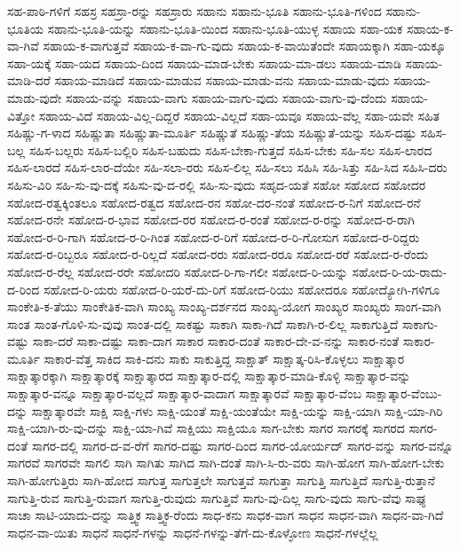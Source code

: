 {ಸಹ-ಪಾಠಿ-ಗಳಿಗೆ
ಸಹಸ್ರ
ಸಹಸ್ರಾ-ರನ್ನು
ಸಹಸ್ರಾರು
ಸಹಾನು
ಸಹಾನು-ಭೂತಿ
ಸಹಾನು-ಭೂತಿ-ಗಳಿಂದ
ಸಹಾನು-ಭೂತಿಯ
ಸಹಾನು-ಭೂತಿ-ಯನ್ನು
ಸಹಾನು-ಭೂತಿ-ಯಿಂದ
ಸಹಾನು-ಭೂತಿ-ಯುಳ್ಳ
ಸಹಾಯ
ಸಹಾ-ಯಕ
ಸಹಾಯ-ಕ-ವಾ-ಗಿವೆ
ಸಹಾಯ-ಕ-ವಾಗುತ್ತವೆ
ಸಹಾಯ-ಕ-ವಾ-ಗು-ವುದು
ಸಹಾಯ-ಕ-ವಾಯಿತೆಂದೇ
ಸಹಾಯಕ್ಕಾಗಿ
ಸಹಾ-ಯಕ್ಕೂ
ಸಹಾ-ಯಕ್ಕೆ
ಸಹಾ-ಯದ
ಸಹಾಯ-ದಿಂದ
ಸಹಾಯ-ಮಾಡ-ಬೇಕು
ಸಹಾಯ-ಮಾ-ಡಲು
ಸಹಾಯ-ಮಾಡಿ
ಸಹಾಯ-ಮಾಡಿ-ದರೆ
ಸಹಾಯ-ಮಾಡಿದೆ
ಸಹಾಯ-ಮಾಡುವ
ಸಹಾಯ-ಮಾಡು-ವನು
ಸಹಾಯ-ಮಾಡು-ವುದು
ಸಹಾಯ-ಮಾಡು-ವುದೇ
ಸಹಾಯ-ವನ್ನು
ಸಹಾಯ-ವಾಗು
ಸಹಾಯ-ವಾಗು-ವುದು
ಸಹಾಯ-ವಾಗು-ವು-ದೆಂದು
ಸಹಾಯ-ವಿತ್ತೋ
ಸಹಾಯ-ವಿದೆ
ಸಹಾಯ-ವಿಲ್ಲ-ದಿದ್ದರೆ
ಸಹಾಯ-ವಿಲ್ಲದೆ
ಸಹಾ-ಯವೂ
ಸಹಾಯ-ವೆಲ್ಲ
ಸಹಾ-ಯವೇ
ಸಹಿತ
ಸಹಿಷ್ಣು-ಗ-ಳಾದ
ಸಹಿಷ್ಣುತಾ
ಸಹಿಷ್ಣುತಾ-ಮೂರ್ತಿ
ಸಹಿಷ್ಣುತೆ
ಸಹಿಷ್ಣು-ತೆಯ
ಸಹಿಷ್ಣುತೆ-ಯನ್ನು
ಸಹಿಸ-ದಷ್ಟು
ಸಹಿಸ-ಬಲ್ಲ
ಸಹಿಸ-ಬಲ್ಲರು
ಸಹಿಸ-ಬಲ್ಲಿರಿ
ಸಹಿಸ-ಬಹುದು
ಸಹಿಸ-ಬೇಕಾ-ಗುತ್ತದೆ
ಸಹಿಸ-ಬೇಕು
ಸಹಿ-ಸಲ
ಸಹಿಸ-ಲಾರದ
ಸಹಿಸ-ಲಾರದೆ
ಸಹಿಸ-ಲಾರ-ದೆಯೇ
ಸಹಿ-ಸಲಾ-ರರು
ಸಹಿಸ-ಲಿಲ್ಲ
ಸಹಿ-ಸಲು
ಸಹಿಸಿ
ಸಹಿ-ಸಿತ್ತು
ಸಹಿ-ಸಿದ
ಸಹಿಸಿ-ದರು
ಸಹಿಸು-ವಿರಿ
ಸಹಿ-ಸು-ವು-ದಕ್ಕೆ
ಸಹಿಸು-ವು-ದ-ರಲ್ಲಿ
ಸಹಿ-ಸು-ವುದು
ಸಹೃದ-ಯತೆ
ಸಹೋ
ಸಹೋದ
ಸಹೋದರ
ಸಹೋದ-ರತ್ವಕ್ಕಿಂತಲೂ
ಸಹೋದ-ರತ್ವದ
ಸಹೋದ-ರನ
ಸಹೋ-ದರ-ನಂತೆ
ಸಹೋದ-ರ-ನಿಗೆ
ಸಹೋದ-ರನೆ
ಸಹೋದ-ರನೇ
ಸಹೋದ-ರ-ಭಾವ
ಸಹೋದ-ರರ
ಸಹೋದ-ರ-ರಂತೆ
ಸಹೋದ-ರ-ರನ್ನು
ಸಹೋದ-ರ-ರಾಗಿ
ಸಹೋದ-ರ-ರಿ-ಗಾಗಿ
ಸಹೋದ-ರ-ರಿ-ಗಿಂತ
ಸಹೋದ-ರ-ರಿಗೆ
ಸಹೋದ-ರ-ರಿ-ಗೋಸುಗ
ಸಹೋದ-ರ-ರಿದ್ದರು
ಸಹೋದ-ರ-ರಿಬ್ಬರೂ
ಸಹೋದ-ರ-ರಿಲ್ಲದೆ
ಸಹೋದ-ರರು
ಸಹೋದ-ರರೂ
ಸಹೋದ-ರರೆ
ಸಹೋದ-ರ-ರೆಂದು
ಸಹೋದ-ರ-ರೆಲ್ಲ
ಸಹೋದ-ರರೇ
ಸಹೋದರಿ
ಸಹೋದ-ರಿ-ಗಾ-ಗಲೀ
ಸಹೋದ-ರಿ-ಯನ್ನು
ಸಹೋದ-ರಿ-ಯ-ರಾದು-ದ-ರಿಂದ
ಸಹೋದ-ರಿ-ಯರು
ಸಹೋದ-ರಿ-ಯರೆ-ದು-ರಿಗೆ
ಸಹೋದ-ರಿಯು
ಸಹೋದರೂ
ಸಹೋದ್ಯೋಗಿ-ಗಳಿಗೂ
ಸಾಂಕೇತಿ-ಕ-ತೆಯು
ಸಾಂಕೇತಿಕ-ವಾಗಿ
ಸಾಂಖ್ಯ
ಸಾಂಖ್ಯ-ದರ್ಶನದ
ಸಾಂಖ್ಯ-ಯೋಗ
ಸಾಂಖ್ಯರ
ಸಾಂಖ್ಯರು
ಸಾಂಗ-ವಾಗಿ
ಸಾಂತ
ಸಾಂತ-ಗೊಳಿ-ಸು-ವುವು
ಸಾಂತ-ದಲ್ಲಿ
ಸಾಕಷ್ಟು
ಸಾಕಾಗಿ
ಸಾಕಾ-ಗಿದೆ
ಸಾಕಾಗಿ-ರ-ಲಿಲ್ಲ
ಸಾಕಾಗುತ್ತಿದೆ
ಸಾಕಾಗು-ವಷ್ಟು
ಸಾಕಾ-ದರೆ
ಸಾಕಾ-ದಷ್ಟು
ಸಾಕಾ-ದಾಗ
ಸಾಕಾರ
ಸಾಕಾರ-ದಂತೆ
ಸಾಕಾರ-ದೇ-ವ-ನನ್ನು
ಸಾಕಾರ-ನಂತೆ
ಸಾಕಾರ-ಮೂರ್ತಿ
ಸಾಕಾರ-ವೆತ್ತ
ಸಾಕಿದ
ಸಾಕಿ-ದನು
ಸಾಕು
ಸಾಕುತ್ತಿದ್ದ
ಸಾಕ್ಷಾತ್
ಸಾಕ್ಷಾತ್ಕ-ರಿಸಿ-ಕೊಳ್ಳಲು
ಸಾಕ್ಷಾತ್ಕಾರ
ಸಾಕ್ಷಾತ್ಕಾರಕ್ಕಾಗಿ
ಸಾಕ್ಷಾತ್ಕಾರಕ್ಕೆ
ಸಾಕ್ಷಾತ್ಕಾರದ
ಸಾಕ್ಷಾತ್ಕಾರ-ದಲ್ಲಿ
ಸಾಕ್ಷಾತ್ಕಾರ-ಮಾಡಿ-ಕೊಳ್ಳಿ
ಸಾಕ್ಷಾತ್ಕಾರ-ವನ್ನು
ಸಾಕ್ಷಾತ್ಕಾರ-ವನ್ನೂ
ಸಾಕ್ಷಾತ್ಕಾರ-ವಲ್ಲದೆ
ಸಾಕ್ಷಾತ್ಕಾರ-ವಾದಾಗ
ಸಾಕ್ಷಾತ್ಕಾರವೆ
ಸಾಕ್ಷಾತ್ಕಾರ-ವೆಂಬ
ಸಾಕ್ಷಾತ್ಕಾರ-ವೆಂಬು-ದನ್ನು
ಸಾಕ್ಷಾತ್ಕಾರವೇ
ಸಾಕ್ಷಿ
ಸಾಕ್ಷಿ-ಗಳು
ಸಾಕ್ಷಿ-ಯಂತೆ
ಸಾಕ್ಷಿ-ಯಂತೆಯೇ
ಸಾಕ್ಷಿ-ಯನ್ನು
ಸಾಕ್ಷಿ-ಯಾಗಿ
ಸಾಕ್ಷಿ-ಯಾ-ಗಿರಿ
ಸಾಕ್ಷಿ-ಯಾಗಿ-ರು-ವು-ದನ್ನು
ಸಾಕ್ಷಿ-ಯಾ-ಗಿವೆ
ಸಾಕ್ಷಿಯು
ಸಾಕ್ಷಿಯೂ
ಸಾಗ-ಬೇಕು
ಸಾಗರ
ಸಾಗರಕ್ಕೆ
ಸಾಗರದ
ಸಾಗರ-ದಂತೆ
ಸಾಗರ-ದಲ್ಲಿ
ಸಾಗರ-ದ-ವ-ರೆಗೆ
ಸಾಗರ-ದಷ್ಟು
ಸಾಗರ-ದಿಂದ
ಸಾಗರ-ಯೋರ್ಯದ್
ಸಾಗರ-ವನ್ನು
ಸಾಗರ-ವನ್ನೊ
ಸಾಗರವೆ
ಸಾಗರವೇ
ಸಾಗಲಿ
ಸಾಗಿ
ಸಾಗಿತು
ಸಾಗಿದ
ಸಾಗಿ-ದಂತೆ
ಸಾಗಿ-ಸಿ-ರು-ವರು
ಸಾಗಿ-ಹೋಗ
ಸಾಗಿ-ಹೋಗ-ಬೇಕು
ಸಾಗಿ-ಹೋಗುತ್ತಿರು
ಸಾಗಿ-ಹೋದ
ಸಾಗುತ್ತ
ಸಾಗುತ್ತಲೇ
ಸಾಗುತ್ತವೆ
ಸಾಗುತ್ತಾ
ಸಾಗುತ್ತಿ
ಸಾಗುತ್ತಿದೆ
ಸಾಗುತ್ತಿ-ರುತ್ತಾನೆ
ಸಾಗುತ್ತಿ-ರುವ
ಸಾಗುತ್ತಿ-ರುವಾಗ
ಸಾಗುತ್ತಿ-ರುವುದು
ಸಾಗುತ್ತಿವೆ
ಸಾಗು-ವು-ದಿಲ್ಲ
ಸಾಗು-ವುದು
ಸಾಗು-ವೆವು
ಸಾಘ್ಯ
ಸಾಚಾ
ಸಾಟಿ-ಯಾದು-ದನ್ನು
ಸಾತ್ತ್ವಿಕ
ಸಾತ್ತ್ವಿಕ-ರೆಂದು
ಸಾಧ-ಕನು
ಸಾಧಕ-ವಾಗ
ಸಾಧನ
ಸಾಧನ-ವಾಗಿ
ಸಾಧನ-ವಾ-ಗಿದೆ
ಸಾಧನ-ವಾ-ಯಿತು
ಸಾಧನೆ
ಸಾಧನೆ-ಗಳನ್ನು
ಸಾಧನೆ-ಗಳನ್ನು-ತೆಗೆ-ದು-ಕೊಳ್ಳೋಣ
ಸಾಧನೆ-ಗಳಲ್ಲೆಲ್ಲ
}
